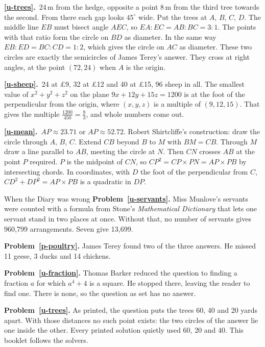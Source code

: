 \documentclass[11pt,a4paper]{article}
\newcommand{\ans}[2]{\par\smallskip\noindent\textbf{\ref{#1}.}\ #2}
\begin{document}
\ans{u-trees}{24\,m from the hedge, opposite a point 8\,m from the third tree towards
the second. From there each gap looks $45^\circ$ wide. Put the trees at $A$, $B$, $C$,
$D$. The middle line $EB$ must bisect angle $AEC$, so $EA : EC = AB : BC = 3 : 1$. The
points with that ratio form the circle on $BD$ as diameter. In the same way
$EB : ED = BC : CD = 1 : 2$, which gives the circle on $AC$ as diameter. These two circles
are exactly the semicircles of James Terey's answer. They cross at right angles, at the
point $(72, 24)$ when $A$ is the origin.}
\ans{u-sheep}{24 at \pounds9, 32 at \pounds12 and 40 at \pounds15, 96 sheep in all. The smallest value of
$x^2 + y^2 + z^2$ on the plane $9x + 12y + 15z = 1200$ is at the foot of the
perpendicular from the origin, where $(x,y,z)$ is a multiple of $(9, 12, 15)$. That
gives the multiple $\tfrac{1200}{450} = \tfrac83$, and whole numbers come out.}
\ans{u-mean}{$AP \approx 23.71$ or $AP \approx 52.72$. Robert Shirtcliffe's
construction: draw the circle through $A$, $B$, $C$. Extend $CB$ beyond $B$ to $M$ with
$BM = CB$. Through $M$ draw a line parallel to $AB$, meeting the circle at $N$. Then $CN$
crosses $AB$ at the point $P$ required. $P$ is the midpoint of $CN$, so
$CP^2 = CP\times PN = AP\times PB$ by intersecting chords. In coordinates, with $D$ the
foot of the perpendicular from $C$, $CD^2 + DP^2 = AP\times PB$ is a quadratic in $DP$.}

\begin{diarynote}{When the Diary was wrong}
\textbf{Problem~\ref{u-servants}.} Miss Munlove's servants were counted with a formula
from Stone's \textit{Mathematical Dictionary} that lets one servant stand in two places
at once. Without that, no number of servants gives 960,799 arrangements. Seven give
13,699.

\textbf{Problem~\ref{p-poultry}.} James Terey found two of the three answers. He missed
11 geese, 3 ducks and 14 chickens.

\textbf{Problem~\ref{u-fraction}.} Thomas Barker reduced the question to finding a
fraction $a$ for which $a^4 + 4$ is a square. He stopped there, leaving the reader to
find one. There is none, so the question as set has no answer.

\textbf{Problem~\ref{u-trees}.} As printed, the question puts the trees 60, 40 and 20
yards apart. With those distances no such point exists: the two circles of the answer
lie one inside the other. Every printed solution quietly used 60, 20 and 40. This
booklet follows the solvers.
\end{diarynote}
\end{document}
